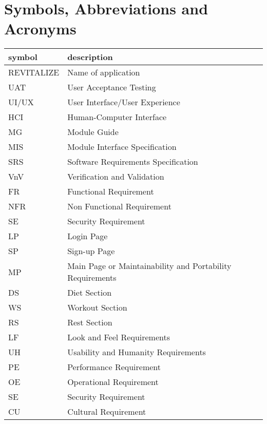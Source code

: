 \documentclass[12pt, titlepage]{article}
\begin{document}
\newpage

\tableofcontents

\listoftables

\newpage

\section{Symbols, Abbreviations and Acronyms}

\renewcommand{\arraystretch}{1.2}
\begin{tabular}{l l} 
	\toprule		
	\textbf{symbol} & \textbf{description}\\
	\midrule 
	REVITALIZE & Name of application\\
	UAT & User Acceptance Testing\\
	UI/UX & User Interface/User Experience\\
	HCI & Human-Computer Interface\\
	MG & Module Guide\\
	MIS & Module Interface Specification\\
	SRS & Software Requirements Specification\\
	VnV & Verification and Validation\\
	FR & Functional Requirement\\
	NFR & Non Functional Requirement\\
	SE & Security Requirement\\
	LP & Login Page\\
	SP & Sign-up Page\\
	MP & Main Page or Maintainability and Portability Requirements\\
	DS & Diet Section\\
	WS & Workout Section\\
	RS & Rest Section\\
	LF & Look and Feel Requirements\\
	UH & Usability and Humanity Requirements\\
	PE & Performance Requirement\\
	OE & Operational Requirement\\
	SE & Security Requirement\\
	CU & Cultural Requirement\\
	\bottomrule
\end{tabular}\\

\newpage

\end{document}
